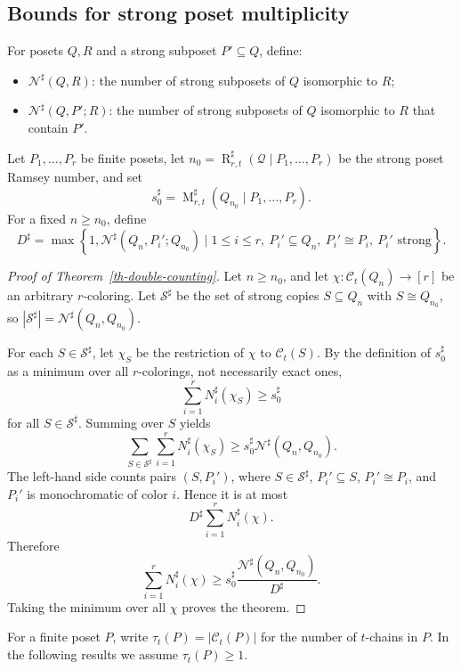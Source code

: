 \documentclass[twoside,12pt]{article}
\begin{document}
\subsection{Bounds for strong poset multiplicity}

For posets $Q,R$ and a strong subposet $P'\subseteq Q$, define:
\begin{itemize}
\item $\mathcal N^\sharp(Q,R)$: the number of strong subposets of $Q$ isomorphic to $R$;
\item $\mathcal N^\sharp(Q,P';R)$: the number of strong subposets of $Q$ isomorphic to $R$ that contain $P'$.
\end{itemize}
Let $P_1,\dots,P_r$ be finite posets, let $n_0=\operatorname R^\sharp_{r,t}(\mathcal Q\mid P_1,\dots,P_r)$ be the strong poset Ramsey number, and set
\[
s_0^\sharp=\operatorname M^\sharp_{r,t}(Q_{n_0}\mid P_1,\dots,P_r).
\]
For a fixed $n\geq n_0$, define
\[
D^\sharp=\max\left\{1,\mathcal N^\sharp(Q_n,P_i';Q_{n_0})\mid 1\leq i\leq r,\ P_i'\subseteq Q_n,\ P_i'\cong P_i,\ P_i'\text{ strong}\right\}.
\]

\begin{proof}[Proof of Theorem~\ref{th-double-counting}]
Let $n\geq n_0$, and let $\chi:\mathcal C_t(Q_n)\to[r]$ be an arbitrary $r$-coloring. Let $\mathcal S^\sharp$ be the set of strong copies $S\subseteq Q_n$ with $S\cong Q_{n_0}$, so $|\mathcal S^\sharp|=\mathcal N^\sharp(Q_n,Q_{n_0})$.

For each $S\in\mathcal S^\sharp$, let $\chi_S$ be the restriction of $\chi$ to $\mathcal C_t(S)$. By the definition of $s_0^\sharp$ as a minimum over all $r$-colorings, not necessarily exact ones,
\[
\sum_{i=1}^r N_i^\sharp(\chi_S)\geq s_0^\sharp
\]
for all $S\in\mathcal S^\sharp$. Summing over $S$ yields
\[
\sum_{S\in\mathcal S^\sharp}\sum_{i=1}^rN_i^\sharp(\chi_S)
\geq s_0^\sharp\mathcal N^\sharp(Q_n,Q_{n_0}).
\]
The left-hand side counts pairs $(S,P_i')$, where $S\in\mathcal S^\sharp$, $P_i'\subseteq S$, $P_i'\cong P_i$, and $P_i'$ is monochromatic of color $i$. Hence it is at most
\[
D^\sharp\sum_{i=1}^rN_i^\sharp(\chi).
\]
Therefore
\[
\sum_{i=1}^rN_i^\sharp(\chi)
\geq s_0^\sharp\frac{\mathcal N^\sharp(Q_n,Q_{n_0})}{D^\sharp}.
\]
Taking the minimum over all $\chi$ proves the theorem.
\end{proof}


For a finite poset $P$, write
$\tau_t(P)=|\mathcal C_t(P)|$
for the number of $t$-chains in $P$. In the following results we assume $\tau_t(P)\geq1$.
\end{document}
